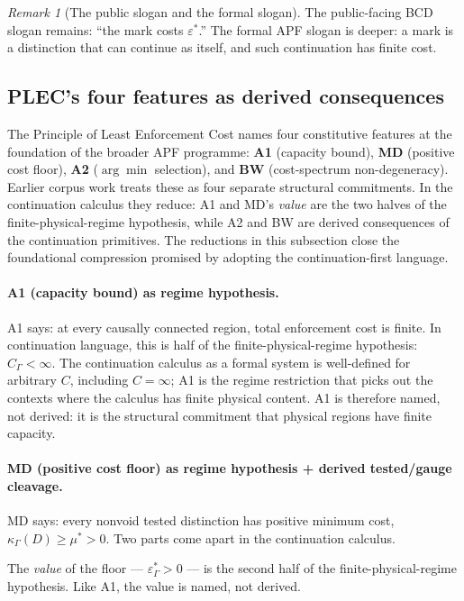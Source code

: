\documentclass[11pt]{article}
\theoremstyle{remark}
\newtheorem{remark}[theorem]{Remark}
\newcommand{\G}{\Gamma}
\newcommand{\Cost}{\kappa}
\newcommand{\floor}{\varepsilon^{\!*}_{\G}}
\newcommand{\eps}{\varepsilon^{\!*}}
\begin{document}
\begin{remark}[The public slogan and the formal slogan]
The public-facing BCD slogan remains: ``the mark costs \(\eps\).''  The formal APF slogan is deeper: a mark is a distinction that can continue as itself, and such continuation has finite cost.
\end{remark}

\subsection{PLEC's four features as derived consequences}\label{sec:plec-recovery}

The Principle of Least Enforcement Cost names four constitutive features at the foundation of the broader APF programme: \textbf{A1} (capacity bound), \textbf{MD} (positive cost floor), \textbf{A2} ($\arg\min$ selection), and \textbf{BW} (cost-spectrum non-degeneracy).  Earlier corpus work treats these as four separate structural commitments.  In the continuation calculus they reduce: A1 and MD's \emph{value} are the two halves of the finite-physical-regime hypothesis, while A2 and BW are derived consequences of the continuation primitives.  The reductions in this subsection close the foundational compression promised by adopting the continuation-first language.

\paragraph{A1 (capacity bound) as regime hypothesis.}
A1 says: at every causally connected region, total enforcement cost is finite.  In continuation language, this is half of the finite-physical-regime hypothesis: $C_\G < \infty$.  The continuation calculus as a formal system is well-defined for arbitrary $C$, including $C = \infty$; A1 is the regime restriction that picks out the contexts where the calculus has finite physical content.  A1 is therefore named, not derived: it is the structural commitment that physical regions have finite capacity.

\paragraph{MD (positive cost floor) as regime hypothesis + derived tested/gauge cleavage.}
MD says: every nonvoid tested distinction has positive minimum cost, $\Cost_\G(D) \ge \mu^* > 0$.  Two parts come apart in the continuation calculus.

The \emph{value} of the floor --- $\floor > 0$ --- is the second half of the finite-physical-regime hypothesis.  Like A1, the value is named, not derived.
\end{document}
